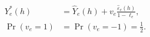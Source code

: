 \par\needspace{88pt}\begin{minipage}{\linewidth}
\begin{equation}\begin{aligned}Y^*_{e}(h)&=\widehat Y_e(h)+v_e\frac{\widehat\varepsilon_e(h)}{1-\ell_e},\\ \Pr(v_e=1)&=\Pr(v_e=-1)=\tfrac12.\end{aligned}\label{eq:12}\end{equation}
\end{minipage}\par
